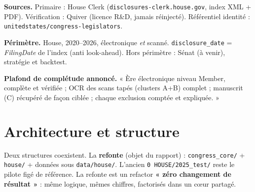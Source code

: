 \documentclass[11pt,a4paper]{article}
\begin{document}
\textbf{Sources.} Primaire : House Clerk (\texttt{disclosures-clerk.house.gov}, index XML + PDF).
Vérification : Quiver (licence R\&D, jamais réinjecté). Référentiel identité :
\texttt{unitedstates/congress-legislators}.

\textbf{Périmètre.} House, 2020--2026, électronique \emph{et} scanné. \texttt{disclosure\_date} =
\emph{FilingDate} de l'index (anti look-ahead). Hors périmètre : Sénat (à venir), stratégie et backtest.

\textbf{Plafond de complétude annoncé.} « Ère électronique niveau Member, complète et vérifiée ; OCR
des scans tapés (clusters A+B) complet ; manuscrit (C) récupéré de façon ciblée ; chaque exclusion
comptée et expliquée. »

\section{Architecture et structure}
Deux structures coexistent. La \textbf{refonte} (objet du rapport) : \texttt{congress\_core/} +
\texttt{house/} + données sous \texttt{data/house/}. L'ancien \texttt{0 HOUSE/2025\_test/} reste le
pilote figé de référence. La refonte est un refactor \textbf{« zéro changement de résultat »} : même
logique, mêmes chiffres, factorisés dans un cœur partagé.
\end{document}
